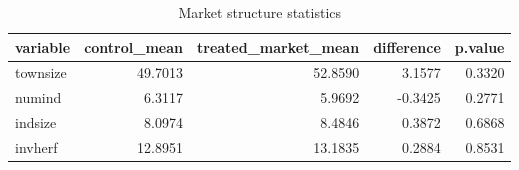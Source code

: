 \begin{table}

\caption{Market structure statistics}
\centering
\begin{tabular}[t]{lrrrr}
\toprule
variable & control\_mean & treated\_market\_mean & difference & p.value\\
\midrule
townsize & 49.7013 & 52.8590 & 3.1577 & 0.3320\\
numind & 6.3117 & 5.9692 & -0.3425 & 0.2771\\
indsize & 8.0974 & 8.4846 & 0.3872 & 0.6868\\
invherf & 12.8951 & 13.1835 & 0.2884 & 0.8531\\
\bottomrule
\end{tabular}
\end{table}
